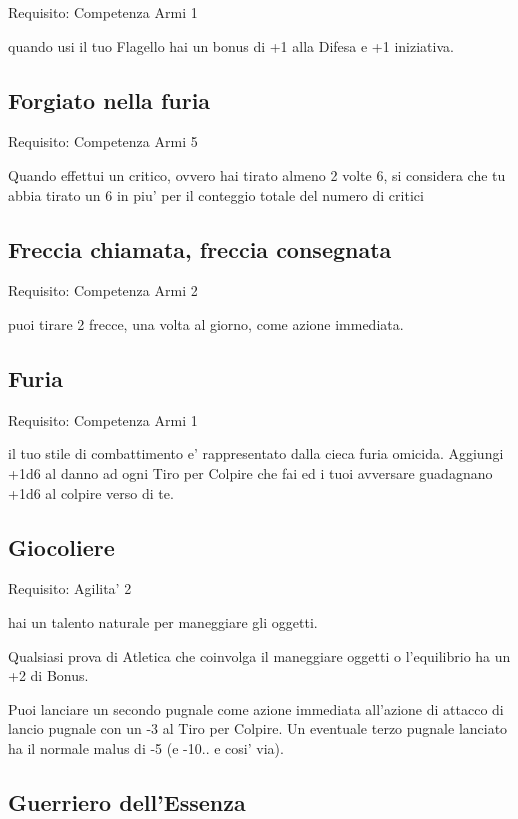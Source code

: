 \documentclass[a4paper,11pt,twoside,openany]{book}
\begin{document}
	Requisito: Competenza Armi 1
	
	quando usi il tuo Flagello hai un bonus di +1 alla Difesa e +1 iniziativa.
	
	\subsection{Forgiato nella furia}
	
	Requisito: Competenza Armi 5
	
	Quando effettui un critico, ovvero hai tirato almeno 2 volte 6, si considera che tu abbia tirato un 6 in piu' per il conteggio totale del numero di critici
	
	\subsection{Freccia chiamata, freccia consegnata}
	
	Requisito: Competenza Armi 2
	
	puoi tirare 2 frecce, una volta al giorno, come azione immediata.
	
	\subsection{Furia}
	
	Requisito: Competenza Armi 1
	
	il tuo stile di combattimento e' rappresentato dalla cieca furia omicida. Aggiungi +1d6 al danno ad ogni Tiro per Colpire che fai ed i tuoi avversare guadagnano +1d6 al colpire verso di te. 
	
	\subsection{Giocoliere}
	
	Requisito: Agilita' 2
	
	hai un talento naturale per maneggiare gli oggetti.
	
	Qualsiasi prova di Atletica che coinvolga il maneggiare oggetti o l'equilibrio ha un +2 di Bonus.
	
	Puoi lanciare un secondo pugnale come azione immediata all'azione di attacco di lancio pugnale con un -3 al Tiro per Colpire. Un eventuale terzo pugnale lanciato ha il normale malus di -5 (e -10.. e cosi' via).
	
	\subsection{Guerriero dell'Essenza}
	
\end{document}
